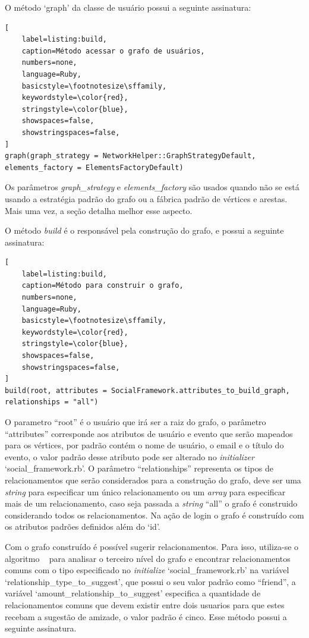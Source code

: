 O método `graph' da classe de usuário possui a seguinte assinatura:

\begin{lstlisting}[
    label=listing:build,
    caption=Método acessar o grafo de usuários,
    numbers=none,
    language=Ruby,
    basicstyle=\footnotesize\sffamily,
    keywordstyle=\color{red},
    stringstyle=\color{blue},
    showspaces=false,
    showstringspaces=false,
]
graph(graph_strategy = NetworkHelper::GraphStrategyDefault, elements_factory = ElementsFactoryDefault)
\end{lstlisting}

Os parâmetros \textit{graph\_strategy} e \textit{elements\_factory} são usados quando não se está usando a estratégia padrão do grafo ou a fábrica padrão de vértices e arestas. Mais uma vez, a seção  detalha melhor esse aspecto.

O método \textit{build} é o responsável pela construção do grafo, e possui a seguinte assinatura:

\begin{lstlisting}[
    label=listing:build,
    caption=Método para construir o grafo,
    numbers=none,
    language=Ruby,
    basicstyle=\footnotesize\sffamily,
    keywordstyle=\color{red},
    stringstyle=\color{blue},
    showspaces=false,
    showstringspaces=false,
]
build(root, attributes = SocialFramework.attributes_to_build_graph, relationships = "all")
\end{lstlisting}

O parametro ``root'' é o usuário que irá ser a raiz do grafo, o parâmetro ``attributes'' corresponde aos atributos de usuário e evento que serão mapeados para os vértices, por padrão contém o nome de usuário, o email e o título do evento, o valor padrão desse atributo pode ser alterado no \textit{initializer} `social\_framework.rb'. O parâmetro ``relationships'' representa os tipos de relacionamentos que serão considerados para a construção do grafo, deve ser uma \textit{string} para especificar um único relacionamento ou um \textit{array} para especificar mais de um relacionamento, caso seja passada a \textit{string} ``all'' o grafo é construido considerando todos os relacionamentos. Na ação de login o grafo é construído com os atributos padrões definidos além do `id'.

Com o grafo construído é possível sugerir relacionamentos. Para isso, utiliza-se o algoritmo ~ para analisar o terceiro nível do grafo e encontrar relacionamentos comuns com o tipo especificado no \textit{initialize} `social\_framework.rb' na variável `relationship\_type\_to\_suggest', que possui o seu valor padrão como ``friend'', a variável `amount\_relationship\_to\_suggest' especifica a quantidade de relacionamentos comuns que devem existir entre dois usuarios para que estes recebam a sugestão de amizade, o valor padrão é cinco. Esse método possui a seguinte assinatura.


